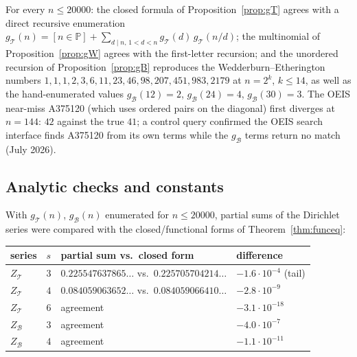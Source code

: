 \documentclass[11pt]{article}
\newcommand{\cT}{\mathcal{T}}   %
\newcommand{\cB}{\mathcal{B}}   %
\numberwithin{equation}{section}
\theoremstyle{plain}
\theoremstyle{definition}
\theoremstyle{remark}
\begin{document}
For every $n \le 20000$: the closed formula of Proposition~\ref{prop:gT} agrees with a
direct recursive enumeration $g_\cT(n) = [n \in \mathbb{P}] + \sum_{d \mid n,\, 1<d<n}
g_\cT(d)\, g_\cT(n/d)$; the multinomial of Proposition~\ref{prop:gW} agrees with the
first-letter recursion; and the unordered recursion of Proposition~\ref{prop:gB}
reproduces the Wedderburn--Etherington numbers
$1,1,1,2,3,6,11,23,46,98,207,451,983,2179$ at $n = 2^k$, $k \le 14$, as well as the
hand-enumerated values $g_\cB(12)=2$, $g_\cB(24)=4$, $g_\cB(30)=3$. The OEIS near-miss
A375120 (which uses ordered pairs on the diagonal) first diverges at $n = 144$: $42$
against the true $41$; a control query confirmed the OEIS search interface finds
A375120 from its own terms while the $g_\cB$ terms return no match (July 2026).

\subsection{Analytic checks and constants}

With $g_\cT(n)$, $g_\cB(n)$ enumerated for $n \le 20000$, partial sums of the
Dirichlet series were compared with the closed/functional forms of
Theorem~\ref{thm:funceq}:

\begin{center}\small
\begin{tabular}{@{}llll@{}}
\toprule
series & $s$ & partial sum vs.\ closed form & difference \\
\midrule
$Z_\cT$ & $3$ & $0.225547637865\ldots$ vs.\ $0.225705704214\ldots$ & $-1.6\cdot10^{-4}$ (tail) \\
$Z_\cT$ & $4$ & $0.084059063652\ldots$ vs.\ $0.084059066410\ldots$ & $-2.8\cdot10^{-9}$ \\
$Z_\cT$ & $6$ & agreement & $-3.1\cdot10^{-18}$ \\
$Z_\cB$ & $3$ & agreement & $-4.0\cdot10^{-7}$ \\
$Z_\cB$ & $4$ & agreement & $-1.1\cdot10^{-11}$ \\
\bottomrule
\end{tabular}
\end{center}
\end{document}
